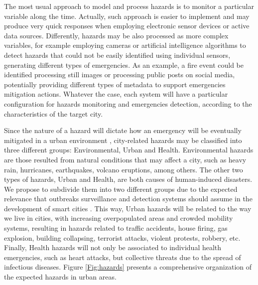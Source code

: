 \begin{refsection}
The most usual approach to model and process hazards is to monitor a particular variable along the time. Actually, such approach is easier to implement and may produce very quick responses when employing electronic sensor devices or active data sources. Differently, hazards may be also processed as more complex variables, for example employing cameras \cite{emergenciesmetric3} or artificial intelligence algorithms \cite{emergenciesAI1} to detect hazards that could not be easily identified using individual sensors, generating different types of emergencies. As an example, a fire event could be identified processing still images or processing public posts on social media, potentially providing different types of metadata to support emergencies mitigation actions. Whatever the case, each system will have a particular configuration for hazards monitoring and emergencies detection, according to the characteristics of the target city.

Since the nature of a hazard will dictate how an emergency will be eventually mitigated in a urban environment \cite{citiesdisasters1,hazard2,hazard4}, city-related hazards may be classified into three different groups: Environmental, Urban and Health. Environmental hazards are those resulted from natural conditions that may affect a city, such as heavy rain, hurricanes, earthquakes, volcano eruptions, among others. The other two types of hazards, Urban and Health, are both causes of human-induced disasters. We propose to subdivide them into two different groups due to the expected relevance that outbreaks surveillance and detection systems should assume in the development of smart cities \cite{covidsmartcities1,covidsmartcities2,enviroment3}. This way, Urban hazards will be related to the way we live in cities, with increasing overpopulated areas and crowded mobility systems, resulting in hazards related to traffic accidents, house firing, gas explosion, building collapsing, terrorist attacks, violent protests, robbery, etc. Finally, Health hazards will not only be associated to individual health emergencies, such as heart attacks, but collective threats due to the spread of infectious diseases. Figure \ref{Fig:hazards} presents a comprehensive organization of the expected hazards in urban areas. 


\end{refsection}
